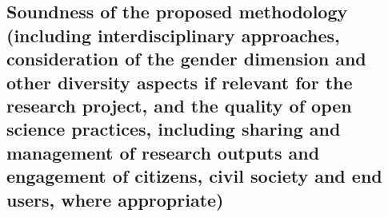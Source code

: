 \subsection{Soundness of the proposed methodology (including interdisciplinary approaches, consideration of the gender dimension and other diversity aspects if relevant for the research project, and the quality of open science practices, including sharing and management of research outputs and engagement of citizens, civil society and end users, where appropriate)}
\label{sec:methodology}
%
%
%
